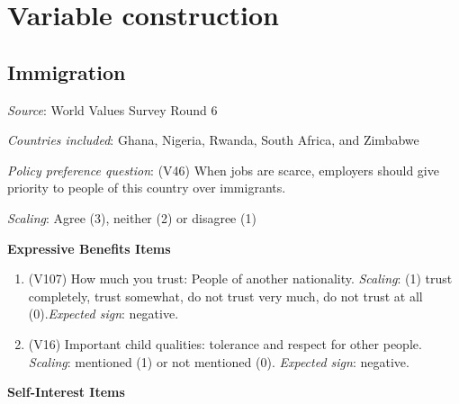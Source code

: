 \documentclass[]{article}
\begin{document}
\section{Variable construction}\label{variable-construction}

\subsection{Immigration}\label{immigration}

\textit{Source}: World Values Survey Round 6

\textit{Countries included}: Ghana, Nigeria, Rwanda, South Africa, and
Zimbabwe

\textit{Policy preference question}: (V46) When jobs are scarce,
employers should give priority to people of this country over
immigrants.

\textit{Scaling}: Agree (3), neither (2) or disagree (1)

\textbf{Expressive Benefits Items}

\begin{enumerate}
  \item (V107) How much you trust: People of another nationality. \textit{Scaling}: (1) trust completely, trust somewhat, do not trust very much, do not trust at all (0).\textit{Expected sign}: negative.
  \item (V16) Important child qualities: tolerance and respect for other people. \textit{Scaling}: mentioned (1) or not mentioned (0). \textit{Expected sign}: negative.
\end{enumerate}

\textbf{Self-Interest Items}
\end{document}
